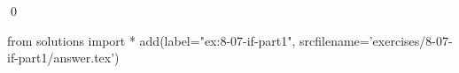 
\begin{ex}
  \label{ex:8-07-if-part1}
  
  \qed
\end{ex}
\begin{python0}
from solutions import *
add(label="ex:8-07-if-part1",
    srcfilename='exercises/8-07-if-part1/answer.tex')
\end{python0}
